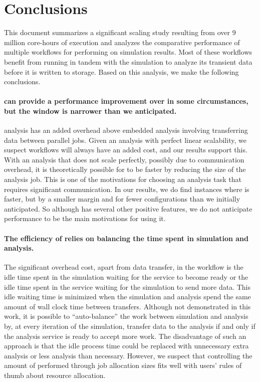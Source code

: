 \section{Conclusions}
\label{sec:Conclusion}

This document summarizes a significant scaling study resulting from over 9
million core-hours of execution and analyzes the comparative performance of
multiple workflows for performing \vda on simulation results.  Most of
these workflows benefit from running in tandem with the simulation to
analyze its transient data before it is written to storage.  Based on this
analysis, we make the following conclusions.

\paragraph{\Intransit can provide a performance improvement over \insitu in
  some circumstances, but the window is narrower than we anticipated.}  
\Intransit analysis has an added overhead above embedded
\insitu analysis involving transferring data between parallel jobs.  Given
an analysis with perfect linear scalability, we suspect \intransit
workflows will always have an added cost, and our results support this.
With an analysis that does not scale perfectly, possibly due to
communication overhead, it is theoretically possible for \intransit to be
faster by reducing the size of the analysis job.  This is one of the
motivations for choosing an analysis task that requires significant
communication.  In our results, we do find instances where \intransit is
faster, but by a smaller margin and for fewer configurations than we
initially anticipated.  So although \intransit has several other positive
features, we do not anticipate performance to be the main motivations for
using it.

\paragraph{The efficiency of \intransit relies on balancing the time spent
  in simulation and analysis.}
The significant overhead cost, apart from data transfer, in the \intransit
workflow is the idle time spent in the simulation waiting for the \vda
service to become ready or the idle time spent in the \vda service waiting
for the simulation to send more data.  This idle waiting time is minimized
when the simulation and analysis spend the same amount of wall clock time
between transfers.  Although not demonstrated in this work, it is possible
to ``auto-balance'' the work between simulation and analysis by, at every
iteration of the simulation, transfer data to the analysis if and only if
the analysis service is ready to accept more work.  The disadvantage of
such an approach is that the idle process time could be replaced with
unnecessary extra analysis or less analysis than necessary.  However, we
suspect that controlling the amount of \vda performed through job
allocation sizes fits well with users' rules of thumb about resource
allocation.

